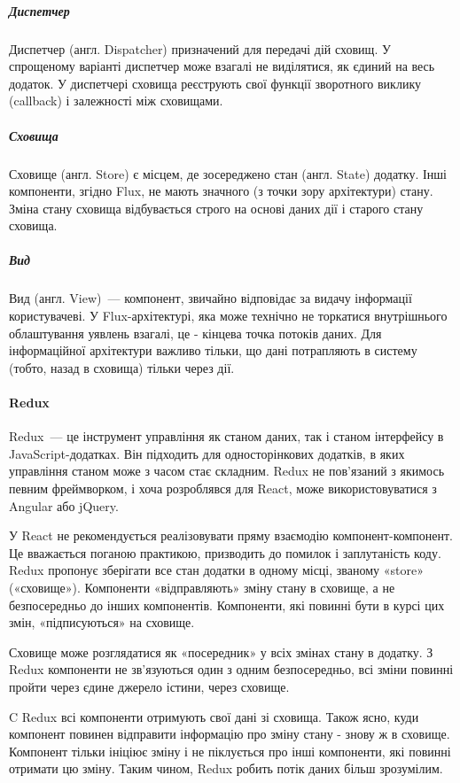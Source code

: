 \subparagraph{Диспетчер}
Диспетчер (англ. Dispatcher) призначений для передачі дій сховищ. У спрощеному варіанті диспетчер може взагалі не виділятися, як єдиний на весь додаток. У диспетчері сховища реєструють свої функції зворотного виклику (callback) і залежності між сховищами.

\subparagraph{Сховища}
Сховище (англ. Store) є місцем, де зосереджено стан (англ. State) додатку. Інші компоненти, згідно Flux, не мають значного (з точки зору архітектури) стану. Зміна стану сховища відбувається строго на основі даних дії і старого стану сховища.

\subparagraph{Вид}
Вид (англ. View)~--- компонент, звичайно відповідає за видачу інформації користувачеві. У Flux-архітектурі, яка може технічно не торкатися внутрішнього облаштування уявлень взагалі, це - кінцева точка потоків даних. Для інформаційної архітектури важливо тільки, що дані потрапляють в систему (тобто, назад в сховища) тільки через дії.

\paragraph{Redux}

Redux~--- це інструмент управління як станом даних, так і станом інтерфейсу в JavaScript-додатках. Він підходить для односторінкових додатків, в яких управління станом може з часом стає складним. Redux не пов'язаний з якимось певним фреймворком, і хоча розроблявся для React, може використовуватися з Angular або jQuery.

У React не рекомендується реалізовувати пряму взаємодію компонент-компонент. Це вважається поганою практикою, призводить до помилок і заплутаність коду. Redux пропонує зберігати все стан додатки в одному місці, званому «store» («сховище»). Компоненти «відправляють» зміну стану в сховище, а не безпосередньо до інших компонентів. Компоненти, які повинні бути в курсі цих змін, «підписуються» на сховище.

Сховище може розглядатися як «посередник» у всіх змінах стану в додатку. З Redux компоненти не зв'язуються один з одним безпосередньо, всі зміни повинні пройти через єдине джерело істини, через сховище.

C Redux всі компоненти отримують свої дані зі сховища. Також ясно, куди компонент повинен відправити інформацію про зміну стану - знову ж в сховище. Компонент тільки ініціює зміну і не піклується про інші компоненти, які повинні отримати цю зміну. Таким чином, Redux робить потік даних більш зрозумілим.

